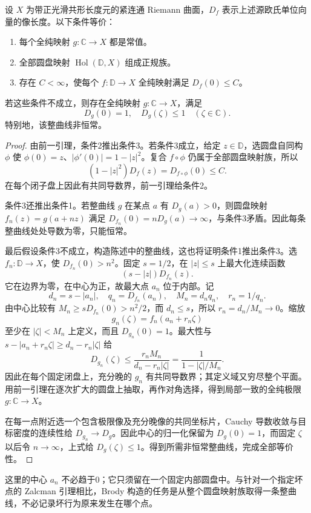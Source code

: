 \begin{theorem}\label{b3:thm:14-brody-curves}
设 \(X\) 为带正光滑共形长度元的紧连通 Riemann 曲面，\(D_f\) 表示上述源欧氏单位向量的像长度。以下条件等价：
\begin{enumerate}
\item 每个全纯映射 \(g:\mathbb C\to X\) 都是常值。
\item 全部圆盘映射 \(\operatorname{Hol}(\mathbb D,X)\) 组成正规族。
\item 存在 \(C<\infty\)，使每个 \(f:\mathbb D\to X\) 全纯映射满足 \(D_f(0)\le C\)。
\end{enumerate}
若这些条件不成立，则存在全纯映射 \(g:\mathbb C\to X\)，满足
\[
 D_g(0)=1,\quad D_g(\zeta)\le1\quad(\zeta\in\mathbb C).
\]
特别地，该整曲线非恒常。
\end{theorem}
\begin{proof}
由前一引理，条件2推出条件3。若条件3成立，给定 \(z\in\mathbb D\)，选圆盘自同构 \(\phi\) 使 \(\phi(0)=z\)、\(|\phi'(0)|=1-|z|^2\)。复合 \(f\circ\phi\) 仍属于全部圆盘映射族，所以
\[
 (1-|z|^2)D_f(z)=D_{f\circ\phi}(0)\le C.
\]
在每个闭子盘上因此有共同导数界，前一引理给条件2。

条件3还推出条件1。若整曲线 \(g\) 在某点 \(a\) 有 \(D_g(a)>0\)，则圆盘映射 \(f_n(z)=g(a+nz)\) 满足 \(D_{f_n}(0)=nD_g(a)\to\infty\)，与条件3矛盾。因此每条整曲线处处导数为零，只能恒常。

最后假设条件3不成立，构造陈述中的整曲线，这也将证明条件1推出条件3。选 \(f_n:\mathbb D\to X\)，使 \(D_{f_n}(0)>n^2\)。固定 \(s=1/2\)，在 \(|z|\le s\) 上最大化连续函数
\[
 (s-|z|)D_{f_n}(z).
\]
它在边界为零，在中心为正，故最大点 \(a_n\) 位于内部。记
\[
 d_n=s-|a_n|,\quad q_n=D_{f_n}(a_n),\quad
 M_n=d_nq_n,\quad r_n=1/q_n.
\]
由中心比较有 \(M_n\ge sD_{f_n}(0)>n^2/2\)，而 \(d_n\le s\)，所以 \(r_n=d_n/M_n\to0\)。缩放
\[
 g_n(\zeta)=f_n(a_n+r_n\zeta)
\]
至少在 \(|\zeta|<M_n\) 上定义，而且 \(D_{g_n}(0)=1\)。最大性与 \(s-|a_n+r_n\zeta|\ge d_n-r_n|\zeta|\) 给
\[
 D_{g_n}(\zeta)
 \le\frac{r_nM_n}{d_n-r_n|\zeta|}
 =\frac1{1-|\zeta|/M_n}.
\]
因此在每个固定闭盘上，充分晚的 \(g_n\) 有共同导数界；其定义域又穷尽整个平面。用前一引理在逐次扩大的圆盘上抽取，再作对角选择，得到局部一致的全纯极限 \(g:\mathbb C\to X\)。

在每一点附近选一个包含极限像及充分晚像的共同坐标片，Cauchy 导数收敛与目标密度的连续性给 \(D_{g_n}\to D_g\)。因此中心的归一化保留为 \(D_g(0)=1\)，而固定 \(\zeta\) 以后令 \(n\to\infty\)，上式给 \(D_g(\zeta)\le1\)。得到所需非恒常整曲线，完成全部等价性。
\end{proof}
这里的中心 \(a_n\) 不必趋于0；它只须留在一个固定内部圆盘中。与针对一个指定坏点的 Zalcman 引理相比，Brody 构造的任务是从整个圆盘映射族取得一条整曲线，不必记录坏行为原来发生在哪个点。

